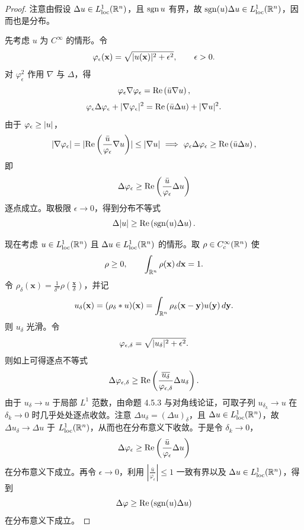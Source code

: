 \begin{proof}
  注意由假设 $\Delta u\in L^1_{\mathrm{loc}}(\mathbb{R}^n)$，且 $\operatorname{sgn} u$ 有界，故 $\operatorname{sgn}(u)\Delta u\in L^1_{\mathrm{loc}}(\mathbb{R}^n)$，因而也是分布。

  先考虑 $u$ 为 $C^\infty$ 的情形。令
  \[
  \varphi_\epsilon(\mathbf{x})=\sqrt{\lvert u(\mathbf{x})\rvert^2+\epsilon^2},\qquad\epsilon>0.
  \]
  对 $\varphi_\epsilon^2$ 作用 $\nabla$ 与 $\Delta$，得
  \[
  \varphi_\epsilon\nabla\varphi_\epsilon=\operatorname{Re}\left(\bar u\nabla u\right),
  \]
  \[
  \varphi_\epsilon\Delta\varphi_\epsilon+\lvert \nabla\varphi_\epsilon\rvert^2
  =\operatorname{Re}\left(\bar u\Delta u\right)+\lvert \nabla u\rvert^2.
  \]
  由于 $\varphi_\epsilon\ge\lvert u\rvert$，
  \[
  \lvert \nabla\varphi_\epsilon\rvert
  =\lvert \operatorname{Re}\left(\frac{\bar u}{\varphi_\epsilon}\nabla u\right)\rvert
  \le\lvert \nabla u\rvert
  \ \Longrightarrow\
  \varphi_\epsilon\Delta\varphi_\epsilon\ge\operatorname{Re}\left(\bar u\Delta u\right),
  \]
  即
  \[
  \Delta\varphi_\epsilon\ge\operatorname{Re}\left(\frac{\bar u}{\varphi_\epsilon}\Delta u\right)
  \]
  逐点成立。取极限 $\epsilon\to0$，得到分布不等式
  \[
  \Delta\lvert u\rvert\ge\operatorname{Re}\left(\operatorname{sgn}(u)\Delta u\right).
  \]

  现在考虑 $u\in L^1_{\mathrm{loc}}(\mathbb{R}^n)$ 且 $\Delta u\in L^1_{\mathrm{loc}}(\mathbb{R}^n)$ 的情形。取 $\rho\in C_c^\infty(\mathbb{R}^n)$ 使
  \[
  \rho\ge0,\qquad\int_{\mathbb{R}^n}\rho(\mathbf{x})\,d\mathbf{x}=1.
  \]
  令 $\rho_\delta(\mathbf{x})=\frac{1}{\delta^n}\rho\left(\frac{\mathbf{x}}{\delta}\right)$，并记
  \[
  u_\delta(\mathbf{x})=(\rho_\delta*u)(\mathbf{x})
  =\int_{\mathbb{R}^n}\rho_\delta(\mathbf{x}-\mathbf{y})u(\mathbf{y})\,d\mathbf{y}.
  \]
  则 $u_\delta$ 光滑。令
  \[
  \varphi_{\epsilon,\delta}=\sqrt{\lvert u_\delta\rvert^2+\epsilon^2}.
  \]
  则如上可得逐点不等式
  \[
  \Delta\varphi_{\epsilon,\delta}\ge\operatorname{Re}\left(\frac{\overline{u_\delta}}{\varphi_{\epsilon,\delta}}\Delta u_\delta\right).
  \]
  由于 $u_\delta\to u$ 于局部 $L^1$ 范数，由命题 4.5.3 与对角线论证，可取子列 $u_{\delta_k}\to u$ 在 $\delta_k\to0$ 时几乎处处逐点收敛。注意 $\Delta u_\delta=(\Delta u)_\delta$，且 $\Delta u\in L^1_{\mathrm{loc}}(\mathbb{R}^n)$，故 $\Delta u_\delta\to\Delta u$ 于 $L^1_{\mathrm{loc}}(\mathbb{R}^n)$，从而也在分布意义下收敛。于是令 $\delta_k\to0$，
  \[
  \Delta\varphi_\epsilon\ge\operatorname{Re}\left(\frac{\bar u}{\varphi_\epsilon}\Delta u\right)
  \]
  在分布意义下成立。再令 $\epsilon\to0$，利用 $\left|\frac{\bar u}{\varphi_\epsilon}\right|\le1$ 一致有界以及 $\Delta u\in L^1_{\mathrm{loc}}(\mathbb{R}^n)$，得到
  \[
  \Delta\varphi\ge\operatorname{Re}\left(\operatorname{sgn}(u)\Delta u\right)
  \]
  在分布意义下成立。
\end{proof}

